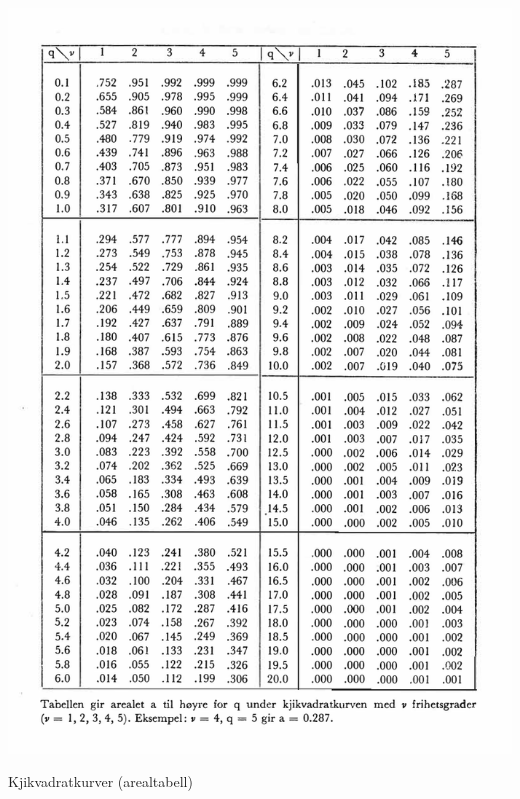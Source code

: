 \begin{table}[H]
\centering
  \includegraphics[scale=1.0]{figurer/Tabell_5a_Kjikvadrat_Areal.pdf}
 \caption{Kjikvadratkurver (arealtabell)}
 \label{tab:Kjikvadrat_Areal} %
\end{table}

